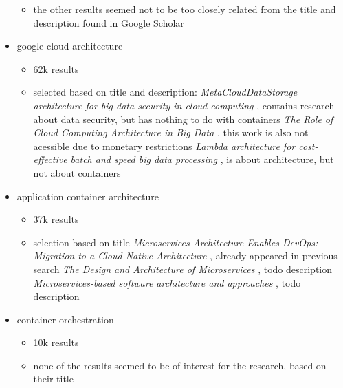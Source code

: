 \documentclass[conference]{IEEEtran}
\begin{document}
\begin{itemize}
\begin{itemize}
	\item the other results seemed not to be too closely related from the title and description found in Google Scholar
\end{itemize}
\item google cloud architecture
\begin{itemize}
	\item 62k results 
	\item selected based on title and description:
	    \textit{MetaCloudDataStorage architecture for big data security in cloud computing} \cite{manogaran2016metaclouddatastorage}, contains research about data security, but has nothing to do with containers
		\textit{The Role of Cloud Computing Architecture in Big Data} \cite{Bahrami2015}, this work is also not acessible due to monetary restrictions
		\textit{Lambda architecture for cost-effective batch and speed big data processing} \cite{Kiran2015}, is about architecture, but not about containers
\end{itemize}
\item application container architecture
\begin{itemize}
	\item 37k results
	\item selection based on title
		\textit{Microservices Architecture Enables DevOps: Migration to a Cloud-Native Architecture} \cite{Balalaie2016}, already appeared in previous search
		\textit{The Design and Architecture of Microservices} \cite{Sill2016}, todo description
		\textit{Microservices-based software architecture and approaches} \cite{Bakshi2017}, todo description
\end{itemize}
\item container orchestration
    \begin{itemize}
        \item 10k results
        \item none of the results seemed to be of interest for the research, based on their title
    \end{itemize}
\end{itemize}
\end{document}
